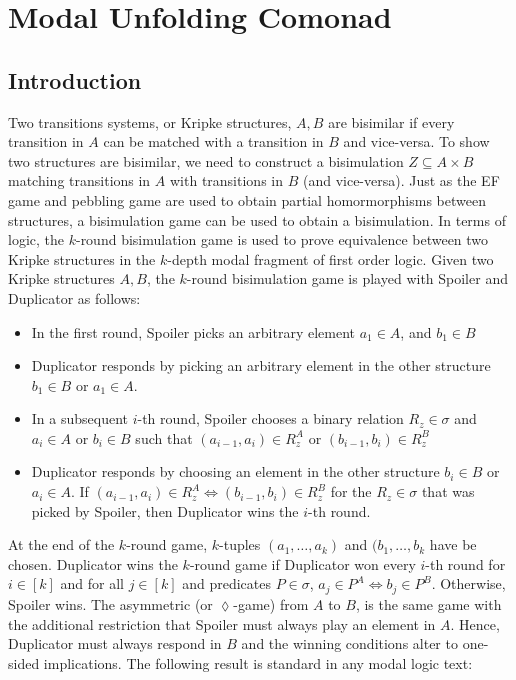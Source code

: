 \chapter{Modal Unfolding Comonad}
\section{Introduction}
Two transitions systems, or Kripke structures, $A,B$ are bisimilar if every transition in $A$ can be matched with a transition in $B$ and vice-versa. To show two structures are bisimilar, we need to construct a bisimulation $Z \subseteq A \times B$ matching transitions in $A$ with transitions in $B$ (and vice-versa). Just as the EF game and pebbling game are used to obtain partial homormorphisms between structures, a bisimulation game can be used to obtain a bisimulation. In terms of logic, the $k$-round bisimulation game is used to prove equivalence between two Kripke structures in the $k$-depth modal fragment of first order logic. Given two Kripke structures $A,B$, the $k$-round bisimulation game is played with Spoiler and Duplicator as follows: 
\begin{itemize} 
\item In the first round, Spoiler picks an arbitrary element $a_{1} \in A$, and $b_{1} \in B$
\item Duplicator responds by picking an arbitrary element in the other structure $b_{1} \in B$ or $a_{1} \in A$.
\item In a subsequent $i$-th round, Spoiler chooses a binary relation $R_{z} \in \sigma$ and $a_{i} \in A$ or $b_{i} \in B$ such that $(a_{i-1},a_{i}) \in R_{z}^{A}$ or $(b_{i-1},b_{i}) \in R_{z}^{B}$
\item Duplicator responds by choosing an element in the other structure $b_{i} \in B$ or $a_{i} \in A$. If $(a_{i-1},a_{i}) \in R_{z}^{A} \Leftrightarrow (b_{i-1},b_{i}) \in R_{z}^{B}$ for the $R_{z} \in \sigma$ that was picked by Spoiler, then Duplicator wins the $i$-th round.  
\end{itemize}
At the end of the $k$-round game, $k$-tuples $(a_{1},\dots,a_{k})$ and $(b_{1},\dots,b_{k}$ have be chosen. Duplicator wins the $k$-round game if Duplicator won every $i$-th round for $i \in [k]$ and for all $j \in [k]$ and predicates $P \in \sigma$, $a_{j} \in P^{A} \Leftrightarrow b_{j} \in P^{B}$. Otherwise, Spoiler wins. The asymmetric (or $\lozenge$-game) from $A$ to $B$, is the same game with the additional restriction that Spoiler must always play an element in $A$. Hence, Duplicator must always respond in $B$ and the winning conditions alter to one-sided implications. The following result is standard in any modal logic text: 
